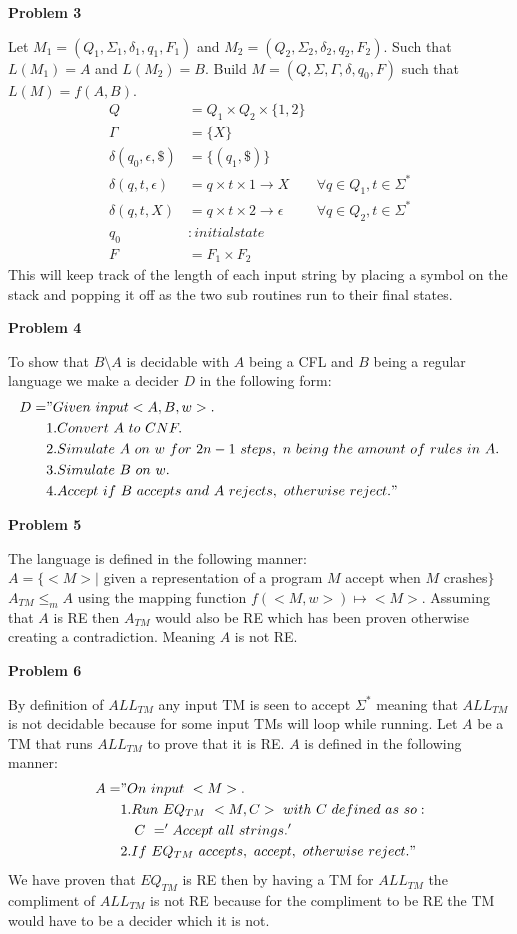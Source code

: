 \documentclass[letterpaper,12pt]{article}
\makeatletter
\let\oldsetminus\setminus
\renewcommand*\setminus{\mathbin\oldsetminus}
\newcommand\exercise[1]{\par\vspace{4ex}\normalfont\normalsize\noindent
\textbf{\large Problem #1}\par\nobreak\@afterindentfalse\@afterheading}
\makeatother
\begin{document}
\exercise{3}
Let $M_1 = (Q_1, \Sigma_1, \delta_1, q_1, F_1)$ and $M_2 = (Q_2, \Sigma_2, \delta_2, q_2, F_2)$. Such that $L(M_1) = A$ and  $L(M_2) = B$. Build $M = (Q, \Sigma, \Gamma,\delta, q_0, F)$ such that $L(M) = f(A, B)$.\\
\begin{align*}
Q &=Q_1 \times Q_2 \times \{1,2\}\\
\Gamma &=\{X\}\\
\delta(q_0, \epsilon, \$) &=\{(q_1, \$)\}\\
\delta(q, t, \epsilon) &=q \times t \times 1 \rightarrow X& \forall q \in Q_1, t \in \Sigma^{*}\\
\delta(q, t, X) &=q \times t \times 2 \rightarrow \epsilon& \forall q \in Q_2, t \in \Sigma^{*}\\
q_0&: initial state\\
F&= F_1 \times F_2
\end{align*}
This will keep track of the length of each input string by placing a symbol on the stack and popping it off as the two sub routines run to their final states.

\exercise{4}
To show that $B \setminus A$ is decidable with $A$ being a CFL and $B$ being a regular language we make a decider $D$ in the following form:\\
\begin{align*}
D =& "Given\ input < A, B, w>.\\
&1.Convert\ A\ to\ CNF.\\
&2.Simulate\ A\ on\ w\ for\ 2n-1\ steps,\ n\ being\ the\ amount\ of\ rules\ in\ A.\\
&3.Simulate\ B\ on\ w.\\
&4. Accept\ if\ B\ accepts\ and\ A\ rejects,\ otherwise\ reject."
\end{align*}

\exercise{5}
The language is defined in the following manner:\\
$A = \{ <M> |$ given a representation of a program $M$ accept when $M$ crashes$\}$\\
$A_{TM} \leq_m A$ using the mapping function $f(<M,w>) \mapsto <M>$. Assuming that $A$ is RE then $A_{TM}$ would also be RE which has been proven otherwise creating a contradiction. Meaning $A$ is not RE.\\
\cleardoublepage

\exercise{6}
By definition of $ALL_{TM}$ any input TM is seen to accept $\Sigma^{*}$ meaning that $ALL_{TM}$ is not decidable because for some input TMs will loop while running. Let $A$ be a TM that runs $ALL_{TM}$ to prove that it is RE. $A$ is defined in the following manner:\\
\begin{align*}
A = &"On\ input\ <M>.\\
&1.Run\ EQ_{TM}\ <M, C>\ with\ C\ defined\ as\ so:\\
&\quad C\ ='Accept\ all\ strings.'\\
&2.If\ EQ_{TM}\ accepts,\ accept,\ otherwise\ reject."
\end{align*}
We have proven that $EQ_{TM}$ is RE then by having a TM for $ALL_{TM}$ the compliment of $ALL_{TM}$ is not RE because for the compliment to be RE the TM would have to be a decider which it is not.
\end{document}
